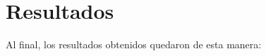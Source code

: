 
\chapter{Resultados} %

\label{Res} %

Al final, los resultados obtenidos quedaron de esta manera: \\

